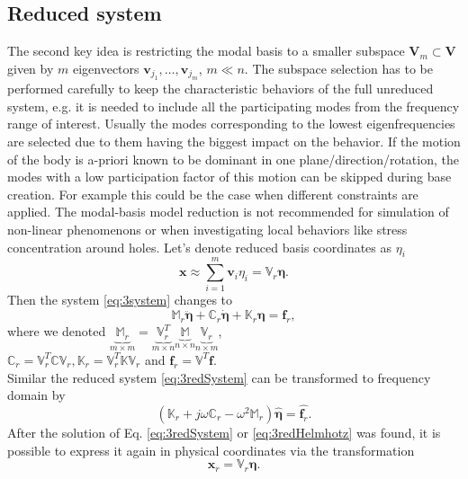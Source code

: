 \documentclass[conference]{journal}
\newcommand{\bb}[1]{\mathbb{#1}}
\newcommand{\B}[1]{\mathbf{#1}}
\newcommand{\Bx}{\B{x}}
\newcommand{\Bv}{\B{v}}
\newcommand{\Beta}{\boldsymbol{\eta}}
\newcommand{\M}{\bb{M}}
\newcommand{\C}{\bb{C}}
\newcommand{\K}{\bb{K}}
\begin{document}
	\subsection{Reduced system}
	The second key idea is restricting the modal basis to a smaller subspace $\B{V}_m \subset \B{V}$ given by $m$ eigenvectors $\Bv_{j_1}, \ldots, \Bv_{j_m}$,  $m \ll n$. The subspace selection has to be performed carefully to keep the characteristic behaviors of the full unreduced system, e.g. it is needed to include all the participating modes from the frequency range of interest. Usually the modes corresponding to the lowest eigenfrequencies are selected due to them having the biggest impact on the behavior. If the motion of the body is a-priori known to be dominant in one plane/direction/rotation, the modes with a low participation factor of this motion can be skipped during base creation. For example this could be the case when different constraints are applied. The modal-basis model reduction is not recommended for simulation of non-linear phenomenons or when investigating local behaviors like stress concentration around holes.
	Let's denote reduced basis coordinates as $\eta_i$
	\begin{equation} \label{eq:3redBasis}
	\Bx \approx \sum\limits_{i=1}^{m} \Bv_i \eta_i = \bb{V}_r \Beta.
	\end{equation}
	Then the system \eqref{eq:3system} changes to
	\begin{equation} \label{eq:3redSystem}
	\M_r \ddot{\Beta} + \C_r \dot{\Beta} + \K_r \Beta = \B{f}_r,
	\end{equation}
	where we denoted $\underbrace{{\M}_r}_{m \times m} = \underbrace{\bb{V}_r^T}_{m \times n} \underbrace{\M}_{n \times n} \underbrace{\bb{V}_r}_{n \times m}$,\\
	$\C_r = \bb{V}^T_r \C \bb{V}_r, \K_r = \bb{V}^T_r \K \bb{V}_r$ and $\B{f}_r = \bb{V}^T \B{f}$. %
	\\Similar the reduced system \eqref{eq:3redSystem} can be transformed to frequency domain by
	\begin{equation} \label{eq:3redHelmhotz}
	(\K_r + j \omega \C_r - \omega^2 \M_r ) \hat{\Beta} = \hat{\B{f}_r}.
	\end{equation}
	After the solution of Eq. \eqref{eq:3redSystem} or \eqref{eq:3redHelmhotz} was found, it is possible to express it again in physical coordinates via the transformation
	\begin{equation} \label{eq:3transfBack}
	\Bx_r = \bb{V}_r \Beta.
	\end{equation}
	
\end{document}
